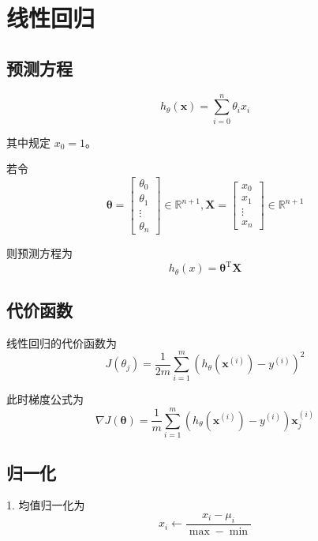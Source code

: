 \section{线性回归}

\subsection{预测方程}
\begin{equation}
    h_\theta(\boldsymbol{x}) = \sum_{i=0}^n \theta_ix_i
\end{equation}

其中规定 $x_0 = 1$。

若令
\begin{equation}
    \boldsymbol{\theta} = \begin{bmatrix}\theta_0 \\ \theta_1 \\ \vdots \\ \theta_n\end{bmatrix} \in \mathbb R^{n+1},
\boldsymbol{X} = \begin{bmatrix}x_0 \\ x_1 \\ \vdots \\ x_n\end{bmatrix} \in \mathbb R^{n+1}
\end{equation}

则预测方程为
\begin{equation}
    h_\theta(x) = \boldsymbol{\theta}^\mathrm T\boldsymbol{X}
\end{equation}

\subsection{代价函数}
线性回归的代价函数为
\begin{equation}
    J(\theta_j) = \dfrac{1}{2m}\sum_{i=1}^m(h_\theta(\boldsymbol{x}^{(i)}) - y^{(i)})^2
\end{equation}

此时梯度公式为
\begin{equation}
    \nabla J(\boldsymbol{\theta}) = \dfrac{1}{m}\sum_{i=1}^m(h_\theta(\boldsymbol{x}^{(i)}) - y^{(i)})\boldsymbol{x}^{(i)}_j
\end{equation}

\subsection{归一化}
1. 均值归一化为
\begin{equation}
    x_i \leftarrow \dfrac{x_i - \mu_i}{\max - \min}
\end{equation}


